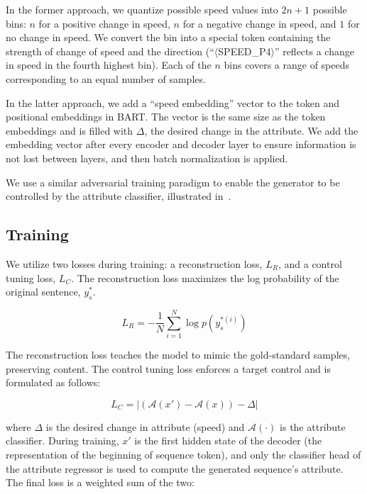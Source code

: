 In the former approach, we quantize possible speed values into $2n + 1$ possible bins: $n$ for a positive change in speed, $n$ for a negative change in speed, and $1$ for no change in speed. We convert the bin into a special token containing the strength of change of speed and the direction (\eg ``$\langle$SPEED\_P4$\rangle$'' reflects a change in speed in the fourth highest bin). Each of the $n$ bins covers a range of speeds corresponding to an equal number of samples.

In the latter approach, we add a ``speed embedding'' vector to the token and positional embeddings in BART. The vector is the same size as the token embeddings and is filled with $\Delta$, the desired change in the attribute. We add the embedding vector after every encoder and decoder layer to ensure information is not lost between layers, and then batch normalization is applied.

We use a similar adversarial training paradigm to enable the generator to be controlled by the attribute classifier, illustrated in~. 

\subsection{Training}
\label{subsec:ac_training}

We utilize two losses during training: a reconstruction loss, $L_R$, and a control tuning loss, $L_C$. The reconstruction loss maximizes the log probability of the original sentence, $y_s^*$.

\begin{equation}
    L_{R} = -\frac{1}{N} \sum_{i=1}^{N} \log p(y_s^{*(i)})
\end{equation}

The reconstruction loss teaches the model to mimic the gold-standard samples, preserving content. The control tuning loss enforces a target control and is formulated as follows:

\begin{equation}
    L_{C} = |(\mathcal{A}(x') - \mathcal{A}(x)) - \Delta|
\end{equation}

where $\Delta$ is the desired change in attribute (\eg speed) and $\mathcal{A}(\cdot)$ is the attribute classifier. During training, $x'$ is the first hidden state of the decoder (\ie the representation of the beginning of sequence token), and only the classifier head of the attribute regressor is used to compute the generated sequence's attribute. The final loss is a weighted sum of the two:

